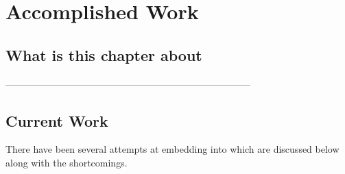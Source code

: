 \documentclass[thesis-solanki.tex]{subfiles}
\begin{document}
\chapter{Accomplished Work}\label{chap:proposedWork}

\section{What is this chapter about}

-----------------------------------------------------------------------------


\section{Current Work}

There have been several attempts at embedding  into  which are discussed below along with the 
shortcomings.
\end{document}
